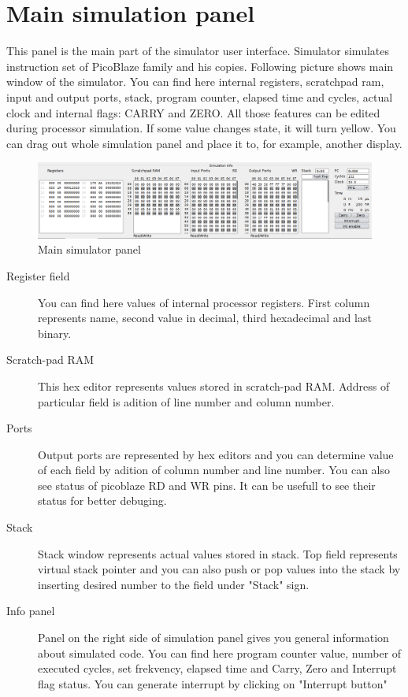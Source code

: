 
\section{Main simulation panel}
    This panel is the main part of the simulator user interface. Simulator simulates instruction set of PicoBlaze family and his copies.
    Following picture shows main window of the simulator. You can find here internal registers, scratchpad ram, input and output ports, stack,
    program counter, elapsed time and cycles, actual clock and internal flags: CARRY and ZERO. All those features can be edited during
    processor simulation. If some value changes state, it will turn yellow. You can drag out whole simulation panel and place it to, for example, another display.
    
   \begin{figure}[h!]
        \centering
        \includegraphics[width=\textwidth]{img/bottom_panel.png}
        \caption{Main simulator panel}
    \end{figure}

    \begin{description}
     \item [Register field] You can find here values of internal processor registers. First column represents name, second value in decimal, third
     hexadecimal and last binary.
     \item [Scratch-pad RAM] This hex editor represents values stored in scratch-pad RAM. Address of particular field is adition of line number
     and column number.
     \item [Ports] Output ports are represented by hex editors and you can determine value of each field by adition of column number and line number.
     You can also see status of picoblaze RD and WR pins. It can be usefull to see their status for better debuging.
     \item [Stack] Stack window represents actual values stored in stack. Top field represents virtual stack pointer and you can also push or pop values into the stack
     by inserting desired number to the field under "Stack" sign.
     \item [Info panel] Panel on the right side of simulation panel gives you general information about simulated code. You can find here program counter
     value, number of executed cycles, set  frekvency, elapsed time and Carry, Zero and Interrupt flag status. You can generate interrupt by clicking on "Interrupt button"
    \end{description}

